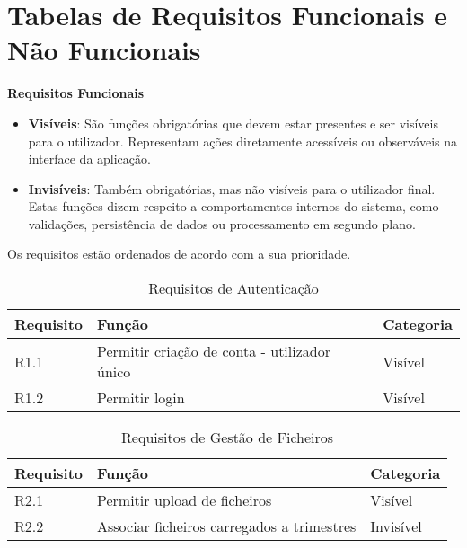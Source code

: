 \chapter{Tabelas de Requisitos Funcionais e Não Funcionais}
\label{ch:tabRequisitos}

\textbf{Requisitos Funcionais}

\begin{itemize}
\item \textbf{Visíveis}: São funções obrigatórias que devem estar presentes e ser visíveis para o utilizador. Representam ações diretamente acessíveis ou observáveis na interface da aplicação.

\item \textbf{Invisíveis}: Também obrigatórias, mas não visíveis para o utilizador final. Estas funções dizem respeito a comportamentos internos do sistema, como validações, persistência de dados ou processamento em segundo plano.
\end{itemize}

Os requisitos estão ordenados de acordo com a sua prioridade.

\begin{table}[H]
\centering
\begin{tabular}{|l|p{7cm}|l|}
\hline
\textbf{Requisito} & \textbf{Função} & \textbf{Categoria} \\
\hline
R1.1 & Permitir criação de conta - utilizador único & Visível \\
R1.2 & Permitir login & Visível \\
\hline
\end{tabular}
\caption{Requisitos de Autenticação}
\label{tab:requisitosAutenticacao}
\end{table}

\begin{table}[H]
\centering
\begin{tabular}{|l|p{7cm}|l|}
\hline
\textbf{Requisito} & \textbf{Função} & \textbf{Categoria} \\
\hline
R2.1 & Permitir upload de ficheiros & Visível \\
R2.2 & Associar ficheiros carregados a trimestres & Invisível \\
\hline
\end{tabular}
\caption{Requisitos de Gestão de Ficheiros}
\label{tab:requisitosFicheiros}
\end{table}

